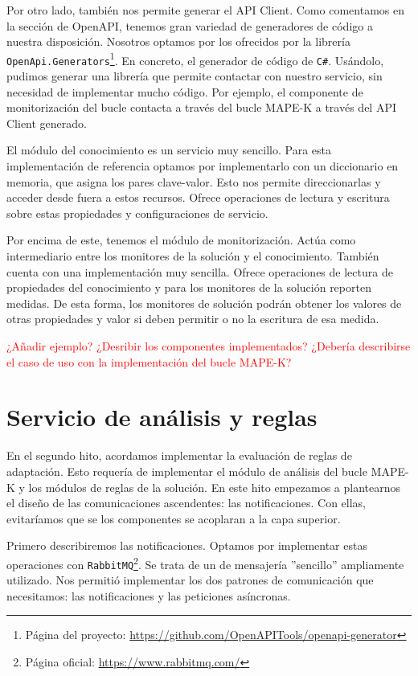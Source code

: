 Por otro lado, también nos permite generar el API Client. Como comentamos en la sección de OpenAPI, tenemos gran variedad de generadores de código a nuestra disposición. Nosotros optamos por los ofrecidos por la librería \texttt{OpenApi.Generators}\footnote{Página del proyecto: \url{https://github.com/OpenAPITools/openapi-generator}}. En concreto, el generador de código de \verb|C#|. Usándolo, pudimos generar una librería que permite contactar con nuestro servicio, sin necesidad de implementar mucho código. Por ejemplo, el componente de monitorización del bucle contacta a través del bucle MAPE-K a través del API Client generado.

El módulo del conocimiento es un servicio muy sencillo. Para esta implementación de referencia optamos por implementarlo con un diccionario en memoria, que asigna los pares clave-valor. Esto nos permite direccionarlas y acceder desde fuera a estos recursos. Ofrece operaciones de lectura y escritura sobre estas propiedades y configuraciones de servicio.

Por encima de este, tenemos el módulo de monitorización. Actúa como intermediario entre los monitores de la solución y el conocimiento. También cuenta con una implementación muy sencilla. Ofrece operaciones de lectura de propiedades del conocimiento y para los monitores de la solución reporten medidas. De esta forma, los monitores de solución podrán obtener los valores de otras propiedades y valor si deben permitir o no la escritura de esa medida.

\textcolor{red}{¿Añadir ejemplo? ¿Desribir los componentes implementados? ¿Debería describirse el caso de uso con la implementación del bucle MAPE-K?}

\section{Servicio de análisis y reglas}

En el segundo hito, acordamos implementar la evaluación de reglas de adaptación. Esto requería de implementar el módulo de análisis del bucle MAPE-K y los módulos de reglas de la solución. En este hito empezamos a plantearnos el diseño de las comunicaciones ascendentes: las notificaciones. Con ellas, evitaríamos que se los componentes se acoplaran a la capa superior.

Primero describiremos las notificaciones. Optamos por implementar estas operaciones con \texttt{RabbitMQ}\footnote{Página oficial: \url{https://www.rabbitmq.com/}}. Se trata de un  de mensajería ''sencillo'' ampliamente utilizado. \cite{newmanBuildingMicroservicesDesigning2021} Nos permitió implementar los dos patrones de comunicación que necesitamos: las notificaciones y las peticiones asíncronas.

